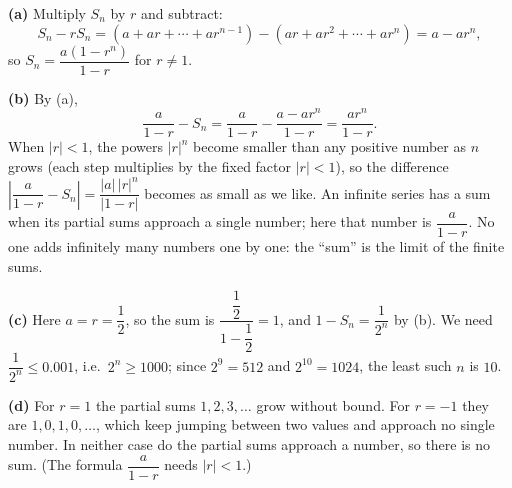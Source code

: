 \textbf{(a)} Multiply $S_n$ by $r$ and subtract:
\[S_n-rS_n=(a+ar+\cdots+ar^{n-1})-(ar+ar^2+\cdots+ar^n)=a-ar^n,\]
so $S_n=\dfrac{a(1-r^n)}{1-r}$ for $r\ne1$.

\textbf{(b)} By (a),
\[\dfrac{a}{1-r}-S_n=\dfrac{a}{1-r}-\dfrac{a-ar^n}{1-r}=\boxed{\dfrac{ar^n}{1-r}}.\]
When $|r|<1$, the powers $|r|^n$ become smaller than any positive number as $n$ grows (each step multiplies by the fixed factor $|r|<1$), so the difference $\left|\dfrac{a}{1-r}-S_n\right|=\dfrac{|a|\,|r|^n}{|1-r|}$ becomes as small as we like. An infinite series has a sum when its partial sums approach a single number; here that number is $\dfrac{a}{1-r}$. No one adds infinitely many numbers one by one: the ``sum'' is the limit of the finite sums.

\textbf{(c)} Here $a=r=\dfrac{1}{2}$, so the sum is $\dfrac{\dfrac{1}{2}}{1-\dfrac{1}{2}}=\boxed{1}$, and $1-S_n=\dfrac{1}{2^n}$ by (b). We need $\dfrac{1}{2^n}\le0.001$, i.e.\ $2^n\ge1000$; since $2^9=512$ and $2^{10}=1024$, the least such $n$ is $\boxed{10}$.

\textbf{(d)} For $r=1$ the partial sums $1,2,3,\dots$ grow without bound. For $r=-1$ they are $1,0,1,0,\dots$, which keep jumping between two values and approach no single number. In neither case do the partial sums approach a number, so there is no sum. (The formula $\dfrac{a}{1-r}$ needs $|r|<1$.)
